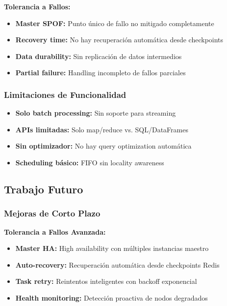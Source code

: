 \textbf{Tolerancia a Fallos:}
\begin{itemize}
    \item \textbf{Master SPOF:} Punto único de fallo no mitigado completamente
    \item \textbf{Recovery time:} No hay recuperación automática desde checkpoints
    \item \textbf{Data durability:} Sin replicación de datos intermedios
    \item \textbf{Partial failure:} Handling incompleto de fallos parciales
\end{itemize}

\subsubsection{Limitaciones de Funcionalidad}

\begin{itemize}
    \item \textbf{Solo batch processing:} Sin soporte para streaming
    \item \textbf{APIs limitadas:} Solo map/reduce vs. SQL/DataFrames
    \item \textbf{Sin optimizador:} No hay query optimization automática
    \item \textbf{Scheduling básico:} FIFO sin locality awareness
\end{itemize}

\subsection{Trabajo Futuro}

\subsubsection{Mejoras de Corto Plazo}

\textbf{Tolerancia a Fallos Avanzada:}
\begin{itemize}
    \item \textbf{Master HA:} High availability con múltiples instancias maestro
    \item \textbf{Auto-recovery:} Recuperación automática desde checkpoints Redis
    \item \textbf{Task retry:} Reintentos inteligentes con backoff exponencial
    \item \textbf{Health monitoring:} Detección proactiva de nodos degradados
\end{itemize}


